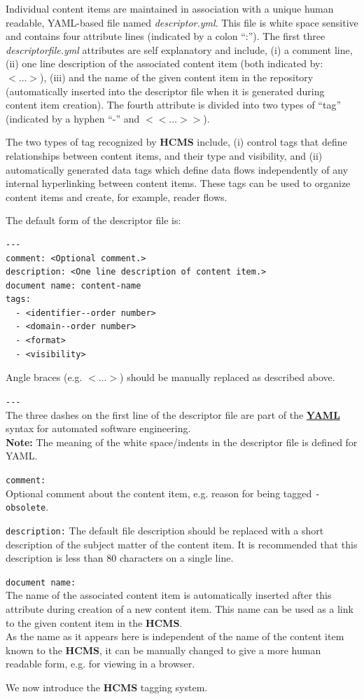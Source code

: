 \documentclass[12pt]{article}
\begin{document}
Individual content items are maintained in association with a unique human readable, YAML-based file named {\it descriptor.yml}. This file is white space sensitive and contains four attribute lines (indicated by a colon ``:''). The first three {\it descriptorfile.yml} attributes are self explanatory and include, (i) a comment line, (ii) one line description of the associated content item (both indicated by: {\small{$<\ldots>$}}), (iii) and the name of the given content item in the repository (automatically inserted into the descriptor file when it is generated during content item creation). The fourth attribute is divided into two types of ``tag'' (indicated by a hyphen ``-''  and {\small{$<<\ldots>>$}}).

The two types of tag recognized by {\bf \small HCMS} include, (i) control tags that define relationships between content items, and their type and visibility, and (ii) automatically generated data tags which define data flows independently of any internal hyperlinking between content items. These tags can be used to organize content items and create, for example, reader flows.

The default form of the descriptor file is:
\begin{verbatim}
---
comment: <Optional comment.>
description: <One line description of content item.>
document name: content-name
tags:
  - <identifier--order number>
  - <domain--order number>
  - <format>
  - <visibility>
\end{verbatim}
Angle braces (e.g. {\small{$<\ldots>$}}) should be manually replaced as described above.
\begin{description}
\item{\tt -{}-{}-}\\
The three dashes on the first line of the descriptor file are part of the \href{http://yaml.org}{\bf \small YAML} syntax for automated software engineering. \\
{\bf Note:} The meaning of the white space/indents in the descriptor file is defined for YAML.
\item{\tt comment:}\\
Optional comment about the content item, e.g. reason for being tagged {\tt -\,obsolete}.
\item{\tt description:} The default file description should be replaced with a short description of the subject matter of the content item. It is recommended that this description is less than 80 characters on a single line.
\item[]{\tt document\,name:}\\
The name of the associated content item is automatically inserted after this attribute during creation of a new content item. This name can be used as a link to the given content item in the {\bf \small HCMS}.\\
As the name as it appears here is independent of the name of the content item known to the {\bf \small HCMS}, it can be manually changed to give a more human readable form, e.g. for viewing in a browser.
\end{description}
We now introduce the {\bf \small HCMS} tagging system.
\end{document}
